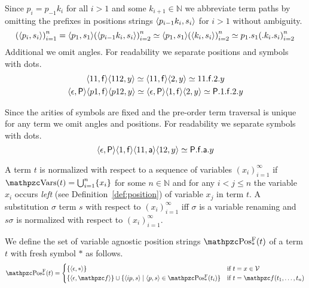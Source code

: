 \begin{notation}\label{notation:term:path}
	Since \( p_{i} = p_{-1} k_{i} \) for
	all \( i > 1 \) and
	some \( k_{i+1}\in\mathbb{N} \)
	we abbreviate term paths by omitting the prefixes in positions strings
	\( \langle p_{i-1} k_{i}, s_{i}\rangle \) for \( i>1 \) without ambiguity.
	\[
		{(\langle p_i, s_i \rangle)}_{i=1}^n
		=
		\langle p_1,s_1\rangle{(\langle p_{i-1}k_i, s_i \rangle)}_{i=2}^n
		\simeq
		\langle p_1,s_1\rangle
		{(\langle k_i, s_i \rangle)}_{i=2}^n
		\simeq
		p_1.s_1{(.k_i.s_i)}_{i=2}^n
	\]
	Additional we omit angles. For readability we separate
	positions and symbols with dots.
	\begin{gather*}
		\langle11,\mathsf{f}\rangle \langle112,y\rangle
		\simeq
		\langle11,\mathsf{f}\rangle \langle2,y\rangle
		\simeq
		11.\mathsf{f}.2.y
		\\
		\langle\epsilon,\mathsf{P}\rangle \langle p1,\mathsf{f}\rangle \langle p12,y\rangle
		\simeq
		\langle\epsilon,\mathsf{P}\rangle \langle1,\mathsf{f}\rangle \langle2,y\rangle
		\simeq
		\mathsf{P}.1.\mathsf{f}.2.y
	\end{gather*}
\end{notation}

\begin{notation}\label{notation:term:traversal}
	Since the arities of symbols are fixed
	and the pre-order term traversal is unique for any term
	we omit angles and positions.
	For readability we separate symbols with dots.
	\[
		\langle\epsilon,\mathsf{P}\rangle \langle1,\mathsf{f}\rangle \langle11,\mathsf{a}\rangle \langle12,y\rangle
		\simeq
		\mathsf{P}.\mathsf{f}.\mathsf{a}. y
	\]
\end{notation}

\begin{definition}[Normalization]\label{def:variable:normalization}
%
A term \( t \) is normalized
with respect to a sequence of variables \( {(x_i)}_{i=1}^\infty \)
if \( \var(t) = \bigcup_{i=1}^n\{ x_i \} \) for some \( n \in \mathbb{N} \)
and for any \( i < j \leq n \) the variable
\( x_i \) occurs \emph{left} (see Definition~\vref{def:position})
of variable \( x_j \) in term \( t \).
A substitution \( \sigma \)  term \( s \)
with respect to \( {(x_i)}_{i=1}^\infty \)
iff \( \sigma \) is a variable renaming and
\( s\sigma \) is normalized with respect to \( {(x_i)}_{i=1}^\infty \).

\end{definition}

\begin{definition}\label{def:agnostic:position:string}
	We define the set of variable agnostic position strings \(\vaPosStr(t)\)
		of a term \( t \) with fresh symbol \( * \) as follows.
		\begin{gather*}
		\vaPosStr(t) =
		\begin{cases}
		\{ \ANGLES{\epsilon,*} \}
		& \text{if }t=x\in\SIGV
		\\
		\{ \ANGLES{\epsilon, \mcf} \} \cup \{ \ANGLES{ip,s}\mid \ANGLES{p,s}
		\in\vaPosStr(t_i)\}
		&\text{if }t=\mcf(t_1,\ldots,t_n)
		\end{cases}
		\end{gather*}
\end{definition}

